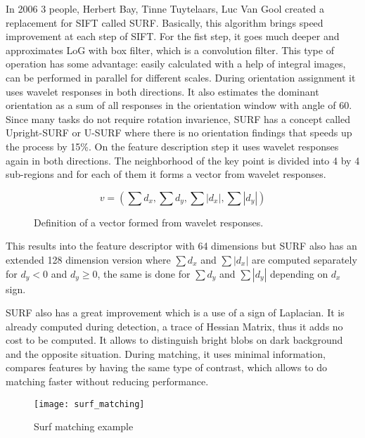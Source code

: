 \documentclass[../../../../main]{subfiles}
\begin{document}
In 2006 3 people, Herbert Bay, Tinne Tuytelaars, Luc Van Gool created a replacement for \ac{SIFT} called \ac{SURF}. Basically, this algorithm brings speed improvement at each step of \ac{SIFT}. For the fist step, it goes much deeper and approximates \ac{LoG} with box filter, which is a convolution filter. This type of operation has some advantage: easily calculated with a help of integral images, can be performed in parallel for different scales. During orientation assignment it uses wavelet responses in both directions. It also estimates the dominant orientation as a sum of all responses in the orientation window with angle of 60\degree. Since many tasks do not require rotation invarience, \ac{SURF} has a concept called Upright-SURF or U-SURF where there is no orientation findings that speeds up the process by 15\%. On the feature description step it uses wavelet responses again in both directions. The neighborhood of the key point is divided into 4 by 4 sub-regions and for each of them it forms a vector from wavelet responses.

\begin{figure} [!ht]
  \centering    
    \begin{equation}
        v = (\sum{d_x},\sum{d_y},\sum{|d_x|},\sum{|d_y|})
    \end{equation}
  \caption{Definition of a vector formed from wavelet responses.}
\end{figure}

This results into the feature descriptor with 64 dimensions but \ac{SURF} also has an extended 128 dimension version where $\sum{d_x}$ and $\sum{|d_x|}$ are computed separately for $d_y<0$ and $d_y\geq0$, the same is done for $\sum{d_y}$ and $\sum{|d_y|}$ depending on $d_x$ sign.

\ac{SURF} also has a great improvement which is a use of a sign of Laplacian. It is already computed during detection, a trace of Hessian Matrix, thus it adds no cost to be computed. It allows to distinguish bright blobs on dark background and the opposite situation. During matching, it uses minimal information, compares features by having the same type of contrast, which allows to do matching faster without reducing performance.

\begin{figure} [ht]
    \begin{center}
        \texttt{[image: surf\_matching]}
        \caption{Surf matching example}
        \label{fig:Surf_Matching}
    \end{center}
\end{figure}
\end{document}
